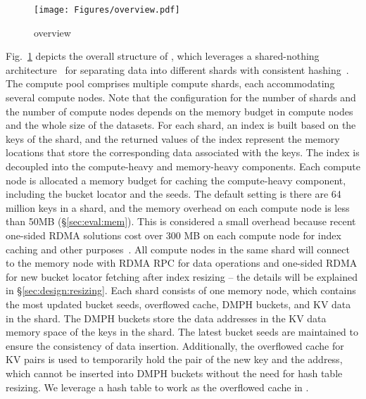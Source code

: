 \begin{figure}[t]
    \centering
    \begin{minipage}[b]{0.9\linewidth}
        \texttt{[image: Figures/overview.pdf]}
        \vspace{-3.5ex}
    \end{minipage}
    \vspace{-1ex}
    \caption{\sys overview}
    \vspace{-3.ex}
    \label{fig:overview}
\end{figure}


Fig.~\ref{fig:overview} depicts the overall structure of \sys, which leverages a shared-nothing architecture~\cite{tutorial} for separating data into different shards with consistent hashing~\cite{consistentHashing}. 
The compute pool comprises multiple compute shards, each accommodating several compute nodes.
Note that the configuration for the number of shards and the number of compute nodes depends on the memory budget in compute nodes and the whole size of the datasets. 
For each shard, an index is built based on the keys of the shard, and the returned values of the index represent the memory locations that store the corresponding data associated with the keys. 
The index is decoupled into the compute-heavy and memory-heavy components.  
Each compute node is allocated a memory budget for caching the compute-heavy component, including the bucket locator and the seeds. The default setting is there are 64 million keys in a shard, and the memory overhead on each compute node is less than 50MB (\S\ref{sec:eval:mem}). This is considered a small overhead because recent one-sided RDMA solutions cost over 300 MB on each compute node for index caching and other purposes~\cite{rolex,xtore}. 
All compute nodes in the same shard will connect to the memory node with RDMA RPC for data operations and one-sided RDMA for new bucket locator fetching after index resizing -- the details will be explained in \S\ref{sec:design:resizing}.
Each shard consists of one memory node, which contains the most updated bucket seeds, overflowed cache, DMPH buckets, and KV data in the shard. 
The DMPH buckets store the data addresses in the KV data memory space of the keys in the shard. The latest bucket seeds are maintained to ensure the consistency of data insertion. Additionally, the overflowed cache for KV pairs is used to temporarily hold the pair of the new key and the address, which cannot be inserted into DMPH buckets without the need for hash table resizing. We leverage a hash table to work as the overflowed cache in \sys.
